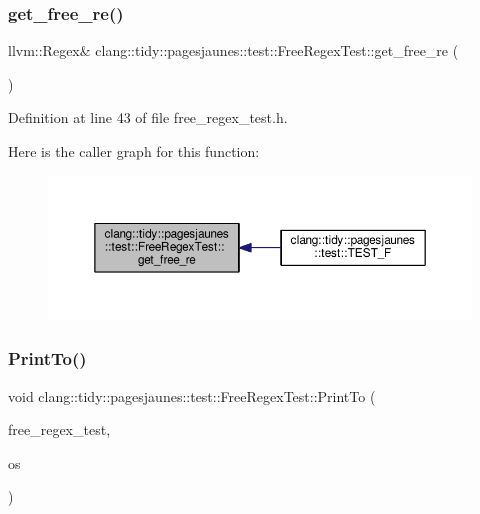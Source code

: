 \subsubsection{\texorpdfstring{get\+\_\+free\+\_\+re()}{get\_free\_re()}}
{\footnotesize\ttfamily llvm\+::\+Regex\& clang\+::tidy\+::pagesjaunes\+::test\+::\+Free\+Regex\+Test\+::get\+\_\+free\+\_\+re (\begin{DoxyParamCaption}{ }\end{DoxyParamCaption})\hspace{0.3cm}{\ttfamily [inline]}}



Definition at line 43 of file free\+\_\+regex\+\_\+test.\+h.

Here is the caller graph for this function\+:
\nopagebreak
\begin{figure}[H]
\begin{center}
\leavevmode
\includegraphics[width=350pt]{classclang_1_1tidy_1_1pagesjaunes_1_1test_1_1_free_regex_test_a76b3ec496589108b3e55c5fea7156a9d_icgraph}
\end{center}
\end{figure}
\mbox{\label{classclang_1_1tidy_1_1pagesjaunes_1_1test_1_1_free_regex_test_a51de645cbcb18a8e6631291cafe5219c}} 
\subsubsection{\texorpdfstring{Print\+To()}{PrintTo()}}
{\footnotesize\ttfamily void clang\+::tidy\+::pagesjaunes\+::test\+::\+Free\+Regex\+Test\+::\+Print\+To (\begin{DoxyParamCaption}\item[{const \hyperlink{classclang_1_1tidy_1_1pagesjaunes_1_1test_1_1_free_regex_test}{Free\+Regex\+Test} \&}]{free\+\_\+regex\+\_\+test,  }\item[{\+::std\+::ostream $\ast$}]{os }\end{DoxyParamCaption})}



